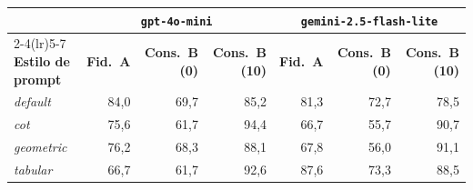 \documentclass[12pt,a4paper]{article}
\begin{document}
\begin{tabular}{lrrrrrr}
\toprule
& \multicolumn{3}{c}{\textbf{\texttt{gpt-4o-mini}}} &
\multicolumn{3}{c}{\textbf{\texttt{gemini-2.5-flash-lite}}} \\
\cmidrule(lr){2-4}\cmidrule(lr){5-7}
\textbf{Estilo de prompt} & \textbf{Fid.\ A} & \textbf{Cons.\ B (0)} &
\textbf{Cons.\ B (10)} &
\textbf{Fid.\ A} & \textbf{Cons.\ B (0)} & \textbf{Cons.\ B (10)} \\
\midrule
\emph{default}   & 84,0 & 69,7 & 85,2 & 81,3 & 72,7 & 78,5 \\
\emph{cot}       & 75,6 & 61,7 & 94,4 & 66,7 & 55,7 & 90,7 \\
\emph{geometric} & 76,2 & 68,3 & 88,1 & 67,8 & 56,0 & 91,1 \\
\emph{tabular}   & 66,7 & 61,7 & 92,6 & 87,6 & 73,3 & 88,5 \\
\bottomrule
\end{tabular}

\bigskip
\end{document}
